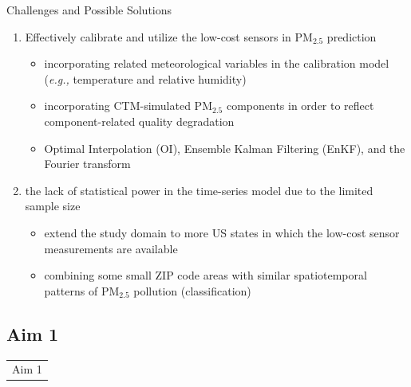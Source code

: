\documentclass[handout]{beamer} %
\begin{document}
\begin{frame}{Challenges and Possible Solutions}
    \begin{enumerate}
        \item Effectively calibrate and utilize the low-cost sensors in PM$_{2.5}$ prediction
            \begin{itemize}
                \item \textcolor[rgb]{0.1,0.1,0.6}{incorporating related meteorological variables in the calibration model (\textit{e.g.,} temperature and relative humidity)}
                \item \textcolor[rgb]{0.1,0.1,0.6}{incorporating CTM-simulated PM$_{2.5}$ components in order to reflect component-related quality degradation}
                \item \textcolor[rgb]{0.1,0.1,0.6}{Optimal Interpolation (OI), Ensemble Kalman Filtering (EnKF), and the Fourier transform}
            \end{itemize}
        \item the lack of statistical power in the time-series model due to the limited sample size
            \begin{itemize}
                \item \textcolor[rgb]{0.1,0.1,0.6}{extend the study domain to more US states in which the low-cost sensor measurements are available}
                \item \textcolor[rgb]{0.1,0.1,0.6}{combining some small ZIP code areas with similar spatiotemporal patterns of PM$_{2.5}$ pollution (classification)}
            \end{itemize}
    \end{enumerate}
\end{frame}


\subsection*{Aim 1}

\begin{frame}{}
    \begin{table}
        \LARGE
        \centering
        \begin{tabular}{c}
             \textcolor[rgb]{0.1,0.1,0.6}{Aim 1}
        \end{tabular}
    \end{table}
\end{frame}
\end{document}
